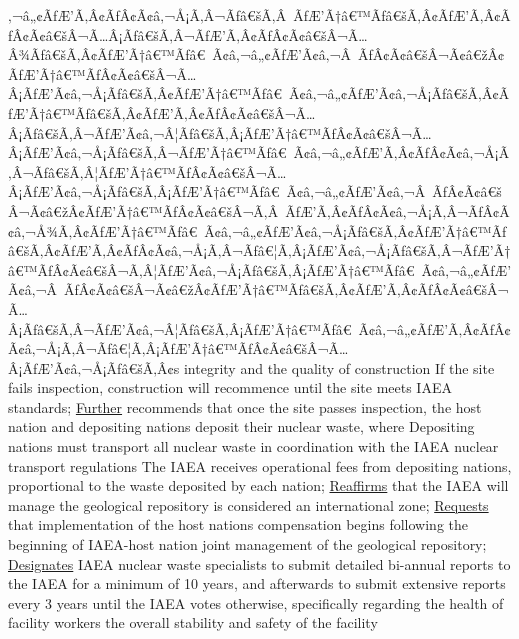\documentclass{article}
\begin{document}
\begin{outline}[enumerate]
‚¬â„¢ÃƒÆ’Ã‚Â¢ÃƒÂ¢Ã¢â‚¬Å¡Ã‚Â¬Ãƒâ€šÃ‚Â ÃƒÆ’Ã†â€™Ãƒâ€šÃ‚Â¢ÃƒÆ’Ã‚Â¢ÃƒÂ¢Ã¢â€šÂ¬Ã…Â¡Ãƒâ€šÃ‚Â¬ÃƒÆ’Ã‚Â¢ÃƒÂ¢Ã¢â€šÂ¬Ã…Â¾Ãƒâ€šÃ‚Â¢ÃƒÆ’Ã†â€™Ãƒâ€ Ã¢â‚¬â„¢ÃƒÆ’Ã¢â‚¬Â ÃƒÂ¢Ã¢â€šÂ¬Ã¢â€žÂ¢ÃƒÆ’Ã†â€™ÃƒÂ¢Ã¢â€šÂ¬Ã…Â¡ÃƒÆ’Ã¢â‚¬Å¡Ãƒâ€šÃ‚Â¢ÃƒÆ’Ã†â€™Ãƒâ€ Ã¢â‚¬â„¢ÃƒÆ’Ã¢â‚¬Å¡Ãƒâ€šÃ‚Â¢ÃƒÆ’Ã†â€™Ãƒâ€šÃ‚Â¢ÃƒÆ’Ã‚Â¢ÃƒÂ¢Ã¢â€šÂ¬Ã…Â¡Ãƒâ€šÃ‚Â¬ÃƒÆ’Ã¢â‚¬Â¦Ãƒâ€šÃ‚Â¡ÃƒÆ’Ã†â€™ÃƒÂ¢Ã¢â€šÂ¬Ã…Â¡ÃƒÆ’Ã¢â‚¬Å¡Ãƒâ€šÃ‚Â¬ÃƒÆ’Ã†â€™Ãƒâ€ Ã¢â‚¬â„¢ÃƒÆ’Ã‚Â¢ÃƒÂ¢Ã¢â‚¬Å¡Ã‚Â¬Ãƒâ€šÃ‚Â¦ÃƒÆ’Ã†â€™ÃƒÂ¢Ã¢â€šÂ¬Ã…Â¡ÃƒÆ’Ã¢â‚¬Å¡Ãƒâ€šÃ‚Â¡ÃƒÆ’Ã†â€™Ãƒâ€ Ã¢â‚¬â„¢ÃƒÆ’Ã¢â‚¬Â ÃƒÂ¢Ã¢â€šÂ¬Ã¢â€žÂ¢ÃƒÆ’Ã†â€™ÃƒÂ¢Ã¢â€šÂ¬Ã‚Â ÃƒÆ’Ã‚Â¢ÃƒÂ¢Ã¢â‚¬Å¡Ã‚Â¬ÃƒÂ¢Ã¢â‚¬Å¾Ã‚Â¢ÃƒÆ’Ã†â€™Ãƒâ€ Ã¢â‚¬â„¢ÃƒÆ’Ã¢â‚¬Å¡Ãƒâ€šÃ‚Â¢ÃƒÆ’Ã†â€™Ãƒâ€šÃ‚Â¢ÃƒÆ’Ã‚Â¢ÃƒÂ¢Ã¢â‚¬Å¡Ã‚Â¬Ãƒâ€¦Ã‚Â¡ÃƒÆ’Ã¢â‚¬Å¡Ãƒâ€šÃ‚Â¬ÃƒÆ’Ã†â€™ÃƒÂ¢Ã¢â€šÂ¬Ã‚Â¦ÃƒÆ’Ã¢â‚¬Å¡Ãƒâ€šÃ‚Â¡ÃƒÆ’Ã†â€™Ãƒâ€ Ã¢â‚¬â„¢ÃƒÆ’Ã¢â‚¬Â ÃƒÂ¢Ã¢â€šÂ¬Ã¢â€žÂ¢ÃƒÆ’Ã†â€™Ãƒâ€šÃ‚Â¢ÃƒÆ’Ã‚Â¢ÃƒÂ¢Ã¢â€šÂ¬Ã…Â¡Ãƒâ€šÃ‚Â¬ÃƒÆ’Ã¢â‚¬Â¦Ãƒâ€šÃ‚Â¡ÃƒÆ’Ã†â€™Ãƒâ€ Ã¢â‚¬â„¢ÃƒÆ’Ã‚Â¢ÃƒÂ¢Ã¢â‚¬Å¡Ã‚Â¬Ãƒâ€¦Ã‚Â¡ÃƒÆ’Ã†â€™ÃƒÂ¢Ã¢â€šÂ¬Ã…Â¡ÃƒÆ’Ã¢â‚¬Å¡Ãƒâ€šÃ‚Â¢s integrity and the quality of construction
\3 If the site fails inspection, construction will recommence until the site meets IAEA standards; 
\1 \underline{Further} recommends that once the site passes inspection, the host nation and depositing nations deposit their nuclear waste, where
\2 Depositing nations must transport all nuclear waste in coordination with the IAEA nuclear transport regulations
\2 The IAEA receives operational fees from depositing nations, proportional to the waste deposited by each nation; 
\1 \underline{Reaffirms} that the IAEA will manage the geological repository is considered an international zone; 
\1 \underline{Requests} that implementation of the host nations compensation begins following the beginning of IAEA-host nation joint management of the geological repository; 
\1 \underline{Designates} IAEA nuclear waste specialists to submit detailed bi-annual reports to the IAEA for a minimum of 10 years, and afterwards to submit extensive reports every 3 years until the IAEA votes otherwise, specifically regarding
\2 the health of facility workers
\2 the overall stability and safety of the facility

\end{outline}
\end{document}
